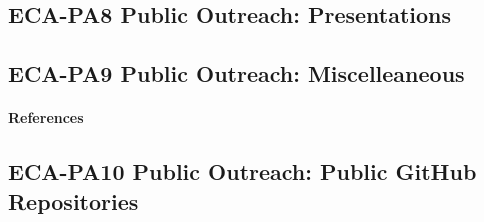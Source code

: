 \subsection{ECA-PA8 Public Outreach: Presentations}
\begin{refsection}
\nocite{moore_biological_2021, moore_how_2021,moore_presentation_2021}
\nocite{grasela_preliminary_2022}
\nocite{moore_invasive_2022}
\begin{comment}
\paragraph{Plans for 15JUN2021-14JUN2022}
I will continue to create and deliver presentations.

\paragraph{Plans for 15JUN2022-14JUN2023}
I will continue to create and deliver presentations.
\end{comment}

\printbibliography[heading=none]
\end{refsection}

\subsection{ECA-PA9 Public Outreach: Miscelleaneous}
\begin{refsection}
\nocite{moore_what_2022}

\paragraph{References}
\begin{comment}
\paragraph{Plans for 15JUN2021-14JUN2022}
None

\paragraph{Plans for 15JUN2022-14JUN2023}
None
\end{comment}
\printbibliography[heading=none]
\end{refsection}

\subsection{ECA-PA10 Public Outreach: Public GitHub Repositories}

